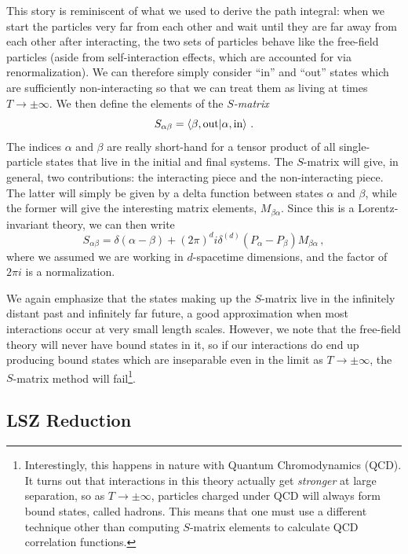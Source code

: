 \documentclass{article}
\numberwithin{equation}{subsection}
\begin{document}
This story is reminiscent of what we used to derive the path integral: when we start the particles very far from each other and wait until they are far away from each other
after interacting, the two sets of particles behave like the free-field particles (aside from self-interaction effects, which are accounted for via renormalization). We can
therefore simply consider ``in'' and ``out'' states which are sufficiently non-interacting so that we can treat them as living at times $T\to \pm \infty$. We then define
the elements of the \textit{$S$-matrix}
\begin{equation}
	S_{\alpha\beta} = \braket{\beta,\text{out}}{\alpha,\text{in}}\,.
\end{equation}
The indices $\alpha$ and $\beta$ are really short-hand for a tensor product of all single-particle states that live in the initial and final systems. The $S$-matrix will
give, in general, two contributions: the interacting piece and the non-interacting piece. The latter will simply be given by a delta function between states $\alpha$ and $\beta$,
while the former will give the interesting matrix elements, $M_{\beta \alpha}$. Since this is a Lorentz-invariant theory, we can then write
\begin{equation}
	S_{\alpha\beta} = \delta(\alpha - \beta) + (2\pi)^d i\delta^{(d)}(P_\alpha - P_\beta)M_{\beta \alpha}\,,
\end{equation}
where we assumed we are working in $d$-spacetime dimensions, and the factor of $2\pi i$ is a normalization.

We again emphasize that the states making up the $S$-matrix live in the infinitely distant past and infinitely far future, a good approximation when most interactions
occur at very small length scales. However, we note that the free-field theory will never have bound states in it, so if our interactions do end up producing
bound states which are inseparable even in the limit as $T\to \pm \infty$, the $S$-matrix method will fail\footnote{Interestingly, this happens in
nature with Quantum Chromodynamics (QCD). It turns out that interactions in this theory actually get \textit{stronger} at large separation, so as
$T\to\pm\infty$, particles charged under QCD will always form bound states, called hadrons. This means that one must use a different technique other
than computing $S$-matrix elements to calculate QCD correlation functions.}.

\subsection{LSZ Reduction}
\end{document}
